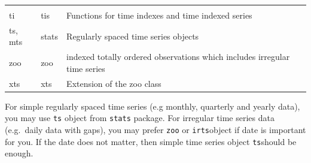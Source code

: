 \documentclass[]{book}
\begin{document}
\begin{longtable}[]{@{}lll@{}}
\begin{minipage}[t]{0.64\columnwidth}
\end{minipage}\tabularnewline
\begin{minipage}[t]{0.12\columnwidth}\raggedright
ti\strut
\end{minipage} & \begin{minipage}[t]{0.15\columnwidth}\raggedright
tis\strut
\end{minipage} & \begin{minipage}[t]{0.64\columnwidth}\raggedright
Functions for time indexes and time indexed series\strut
\end{minipage}\tabularnewline
\begin{minipage}[t]{0.12\columnwidth}\raggedright
ts, mts\strut
\end{minipage} & \begin{minipage}[t]{0.15\columnwidth}\raggedright
stats\strut
\end{minipage} & \begin{minipage}[t]{0.64\columnwidth}\raggedright
Regularly spaced time series objects\strut
\end{minipage}\tabularnewline
\begin{minipage}[t]{0.12\columnwidth}\raggedright
zoo\strut
\end{minipage} & \begin{minipage}[t]{0.15\columnwidth}\raggedright
zoo\strut
\end{minipage} & \begin{minipage}[t]{0.64\columnwidth}\raggedright
indexed totally ordered observations which includes irregular time series\strut
\end{minipage}\tabularnewline
\begin{minipage}[t]{0.12\columnwidth}\raggedright
xts\strut
\end{minipage} & \begin{minipage}[t]{0.15\columnwidth}\raggedright
xts\strut
\end{minipage} & \begin{minipage}[t]{0.64\columnwidth}\raggedright
Extension of the zoo class\strut
\end{minipage}\tabularnewline
\bottomrule
\end{longtable}

For simple regularly spaced time series (e.g monthly, quarterly and yearly data), you may use \texttt{ts} object from \texttt{stats} package. For irregular time series data (e.g.~daily data with gaps), you may prefer \texttt{zoo} or \texttt{irts}object if date is important for you. If the date does not matter, then simple time series object \texttt{ts}should be enough.
\end{document}
